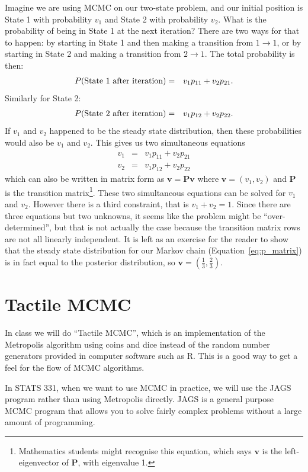 Imagine we are using MCMC on our two-state problem, and our initial position
is State 1 with probability $v_1$ and State 2 with probability $v_2$. What
is the probability of being in State 1 at the next iteration? There are two
ways for that to happen: by starting in State 1 and then making a transition
from $1\to 1$, or by starting in State 2  and making a transition from $2\to 1$.
The total probability is then:
\begin{eqnarray}
P(\textnormal{State 1 after iteration}) &=& v_1p_{11} + v_2p_{21}.
\end{eqnarray}
Similarly for State 2:
\begin{eqnarray}
P(\textnormal{State 2 after iteration}) &=& v_1p_{12} + v_2p_{22}.
\end{eqnarray}
If $v_1$ and $v_2$ happened to be the steady state distribution, then these
probabilities would also be $v_1$ and $v_2$. This gives us two simultaneous
equations
\begin{eqnarray}
v_1 &=& v_1p_{11} + v_2p_{21}\\
v_2 &=& v_1p_{12} + v_2p_{22}
\end{eqnarray}
which can also be written in matrix form as $\mathbf{v} = \mathbf{P}\mathbf{v}$
where $\mathbf{v} = \left(v_1, v_2\right)$ and $\mathbf{P}$ is the transition
matrix\footnote{Mathematics students might recognise this equation, which says
$\mathbf{v}$ is the left-eigenvector of $\mathbf{P}$, with eigenvalue 1.}.
These two simultaneous equations can be solved for $v_1$ and $v_2$.
However there is a third constraint, that is $v_1 + v_2 = 1$. Since there
are three equations but two unknowns, it seems like the problem might be
``over-determined'', but that is not actually the case because the transition
matrix rows are not all linearly independent.
It is left as an exercise for the reader to show that the steady state
distribution for our Markov chain (Equation~\ref{eq:p_matrix}) is in fact
equal to the posterior distribution, so
$\mathbf{v} = \left(\frac{1}{3}, \frac{2}{3}\right)$.

\section{Tactile MCMC}
In class we will do ``Tactile MCMC'', which is an implementation of the
Metropolis algorithm using coins and dice instead of the random number generators
provided in computer software such as R. This is a good way to get a feel for
the flow of MCMC algorithms.

In STATS 331, when we want to use MCMC in practice, we will use the JAGS program
rather than using Metropolis directly. JAGS is a general purpose MCMC program
that allows you to solve fairly complex problems without a large amount of
programming.
